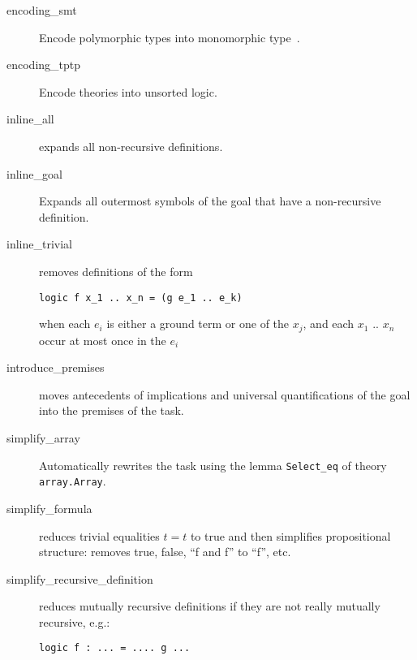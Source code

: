 \begin{description}
\item[encoding\_smt]
  Encode polymorphic types into monomorphic type~\cite{conchon08smt}.

\item[encoding\_tptp]
  Encode theories into unsorted logic. %





\item[inline\_all]
  expands all non-recursive definitions.

\item[inline\_goal] Expands all outermost symbols of the goal that
  have a non-recursive definition.

\item[inline\_trivial]
  removes definitions of the form

\begin{verbatim}
logic f x_1 .. x_n = (g e_1 .. e_k)
\end{verbatim}
when each $e_i$ is either a ground term or one of the $x_j$, and
each $x_1$ .. $x_n$ occur at most once in the $e_i$

\item[introduce\_premises] moves antecedents of implications and
  universal quantifications of the goal into the premises of the task.


\item[simplify\_array] Automatically rewrites the task using the lemma
  \verb|Select_eq| of theory \verb|array.Array|.

\item[simplify\_formula] reduces trivial equalities $t=t$ to true and
  then simplifies propositional structure: removes true, false, ``f
  and f'' to ``f'', etc.

\item[simplify\_recursive\_definition] reduces mutually recursive
  definitions if they are not really mutually recursive, e.g.:
\begin{verbatim}
logic f : ... = .... g ...


\end{verbatim}
\end{description}
